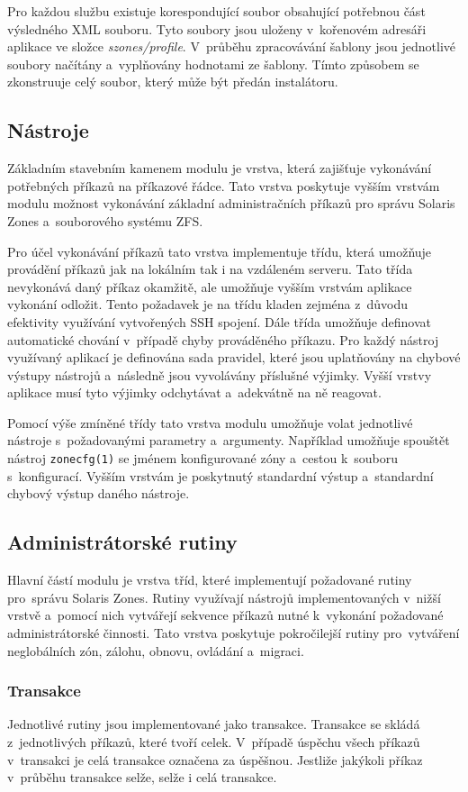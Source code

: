Pro každou službu existuje korespondující soubor obsahující potřebnou část výsledného XML souboru. Tyto soubory jsou
uloženy v~kořenovém adresáři aplikace ve složce \textit{szones/profile}. V~průběhu zpracovávání šablony jsou jednotlivé soubory
načítány a~vyplňovány hodnotami ze šablony. Tímto způsobem se zkonstruuje celý soubor, který může být předán instalátoru.
\subsection{Nástroje}
\label{chapter:implementation:szones:commands}
Základním stavebním kamenem modulu je vrstva, která zajišťuje vykonávání potřebných příkazů na příkazové řádce.
Tato vrstva poskytuje vyšším vrstvám modulu možnost vykonávání základní administračních příkazů pro správu Solaris Zones
a~souborového systému ZFS.

Pro účel vykonávání příkazů tato vrstva implementuje třídu, která umožňuje provádění příkazů jak na lokálním tak i
na vzdáleném serveru. Tato třída nevykonává daný příkaz okamžitě, ale umožňuje vyšším vrstvám aplikace vykonání odložit.
Tento požadavek je na třídu kladen zejména z~důvodu efektivity využívání vytvořených SSH spojení. Dále třída umožňuje
definovat automatické chování v~případě chyby prováděného příkazu. Pro každý nástroj využívaný aplikací je definována sada
pravidel, které jsou uplatňovány na chybové výstupy nástrojů a~následně jsou vyvolávány příslušné výjimky. Vyšší vrstvy
aplikace musí tyto výjimky odchytávat a~adekvátně na ně reagovat.

Pomocí výše zmíněné třídy tato vrstva modulu umožňuje volat jednotlivé nástroje s~požadovanými parametry a~argumenty.
Například umožňuje spouštět nástroj \verb|zonecfg(1)| se jménem konfigurované zóny a~cestou k~souboru s~konfigurací. Vyšším
vrstvám je poskytnutý standardní výstup a~standardní chybový výstup daného nástroje.
\subsection{Administrátorské rutiny}
\label{chapter:implementation:szones:routines}
Hlavní částí modulu je vrstva tříd, které implementují požadované rutiny pro~správu Solaris Zones. Rutiny využívají
nástrojů implementovaných v~nižší vrstvě a~pomocí nich vytvářejí sekvence příkazů nutné k~vykonání požadované administrátorské činnosti.
Tato vrstva poskytuje pokročilejší rutiny pro~vytváření neglobálních zón, zálohu, obnovu, ovládání a~migraci.
\subsubsection{Transakce}
\label{chapter:implementation:szones:routines:transaction}
Jednotlivé rutiny jsou implementované jako transakce. Transakce se skládá z~jednotlivých příkazů, které tvoří
celek. V~případě úspěchu všech příkazů v~transakci je celá transakce označena za úspěšnou. Jestliže jakýkoli příkaz v~průběhu
transakce selže, selže i celá transakce.

